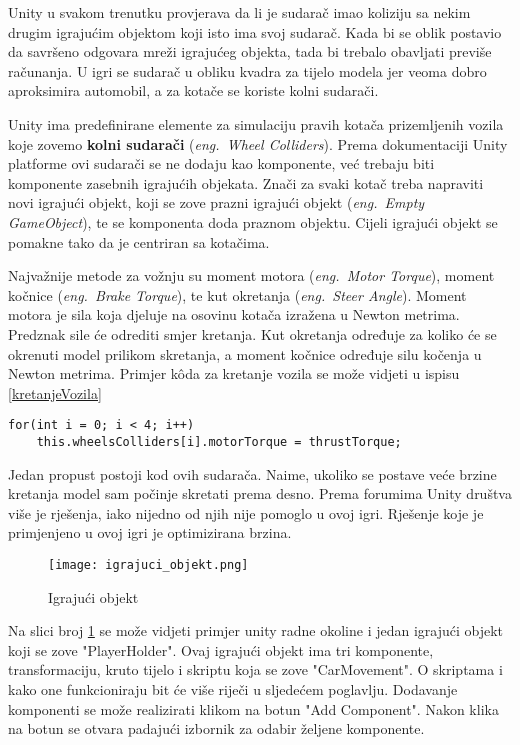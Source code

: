 Unity u svakom trenutku provjerava da li je sudarač imao koliziju sa nekim drugim igrajućim objektom koji isto ima svoj sudarač. Kada bi se oblik postavio da savršeno odgovara mreži igrajućeg objekta, tada bi trebalo obavljati previše računanja. U igri se sudarač u obliku kvadra za tijelo modela jer veoma dobro aproksimira automobil, a za kotače se koriste kolni sudarači.

Unity ima predefinirane elemente za simulaciju pravih kotača prizemljenih vozila koje zovemo \textbf{kolni sudarači} (\emph{eng.~Wheel Colliders}). Prema dokumentaciji Unity platforme ovi sudarači se ne dodaju kao komponente, već trebaju biti komponente zasebnih igrajućih objekata. Znači za svaki kotač treba napraviti novi igrajući objekt, koji se zove prazni igrajući objekt (\emph{eng.~Empty GameObject}), te se komponenta doda praznom objektu. Cijeli igrajući objekt se pomakne tako da je centriran sa kotačima.

Najvažnije metode za vožnju su moment motora (\emph{eng.~Motor Torque}), moment kočnice (\emph{eng.~Brake Torque}), te kut okretanja (\emph{eng.~Steer Angle}). Moment motora je sila koja djeluje na osovinu kotača izražena u Newton metrima. Predznak sile će odrediti smjer kretanja. Kut okretanja određuje za koliko će se okrenuti model prilikom skretanja, a moment kočnice određuje silu kočenja u Newton metrima. Primjer k\^oda za kretanje vozila se može vidjeti u ispisu \ref{kretanjeVozila}

\begin{lstlisting}[caption={Skripta za kretanje vozila}, label=kretanjeVozila]
for(int i = 0; i < 4; i++)
    this.wheelsColliders[i].motorTorque = thrustTorque;
\end{lstlisting}

Jedan propust postoji kod ovih sudarača. Naime, ukoliko se postave veće brzine kretanja model sam počinje skretati prema desno. Prema forumima Unity društva više je rješenja, iako nijedno od njih nije pomoglo u ovoj igri. Rješenje koje je primjenjeno u ovoj igri je optimizirana brzina.

\begin{figure}[h]
	\texttt{[image: igrajuci\_objekt.png]}
	\centering
	\caption{Igrajući objekt}
	\label{fig:igrajuciobjekt}
\end{figure}
\newpage
Na slici broj \ref{fig:igrajuciobjekt} se može vidjeti primjer unity radne okoline i jedan igrajući objekt koji se zove "PlayerHolder". Ovaj igrajući objekt ima tri komponente, transformaciju, kruto tijelo i skriptu koja se zove "CarMovement". O skriptama i kako one funkcioniraju bit će više riječi u sljedećem poglavlju. Dodavanje komponenti se može realizirati klikom na botun "Add Component". Nakon klika na botun se otvara padajući izbornik za odabir željene komponente.

